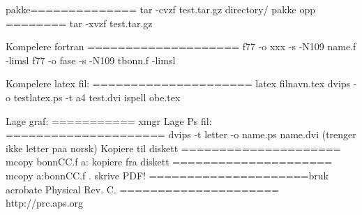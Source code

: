 pakke============== tar -cvzf test.tar.gz directory/
pakke opp ========  tar -xvzf test.tar.gz                   

Kompelere fortran
==================== f77 -o xxx -s -N109 name.f -limsl
                     f77 -o fase -s -N109 tbonn.f -limsl  

Kompelere latex fil:
===================== latex filnavn.tex
dvips -o testlatex.ps -t a4 test.dvi
ispell obe.tex 

Lage graf:
=========== xmgr
Lage Ps fil:
===================== dvips -t letter -o name.ps name.dvi
(trenger ikke letter paa norsk)
Kopiere til diskett
===================== mcopy bonnCC.f a:  
kopiere fra diskett
===================== mcopy a:bonnCC.f .   
skrive PDF! 
=====================bruk acrobate
Physical Rev. C.
===================== http://prc.aps.org





